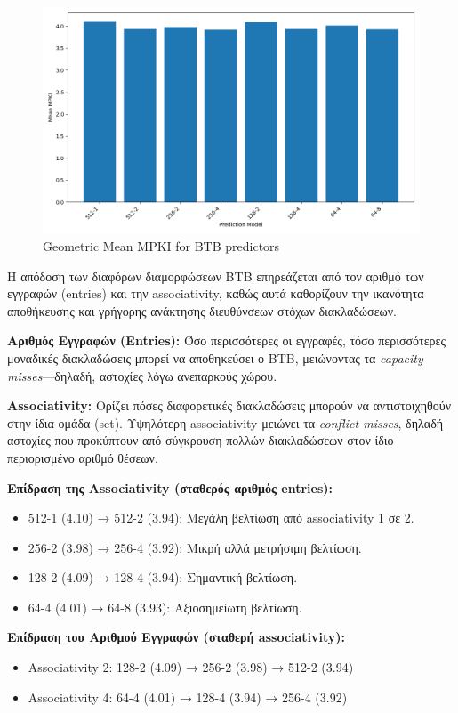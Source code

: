 \documentclass{article}
\begin{document}
\begin{figure}[H]
    \centering
    \includegraphics[width=1\textwidth]{figures/5_4/geom_mean.png}
    \caption{Geometric Mean MPKI for BTB predictors}
    \label{fig:mean_mpkis_BTBs}
\end{figure}

Η απόδοση των διαφόρων διαμορφώσεων BTB επηρεάζεται από τον αριθμό των εγγραφών (entries) και την associativity, καθώς αυτά καθορίζουν την ικανότητα αποθήκευσης και γρήγορης ανάκτησης διευθύνσεων στόχων διακλαδώσεων.

\textbf{Αριθμός Εγγραφών (Entries):} Όσο περισσότερες οι εγγραφές, τόσο περισσότερες μοναδικές διακλαδώσεις μπορεί να αποθηκεύσει ο BTB, μειώνοντας τα \textit{capacity misses}—δηλαδή, αστοχίες λόγω ανεπαρκούς χώρου.

\textbf{Associativity:} Ορίζει πόσες διαφορετικές διακλαδώσεις μπορούν να αντιστοιχηθούν στην ίδια ομάδα (set). Υψηλότερη associativity μειώνει τα \textit{conflict misses}, δηλαδή αστοχίες που προκύπτουν από σύγκρουση πολλών διακλαδώσεων στον ίδιο περιορισμένο αριθμό θέσεων.

\vspace{0.3cm} \textbf{Επίδραση της Associativity (σταθερός αριθμός entries):} \begin{itemize} \item 512-1 (4.10) → 512-2 (3.94): Μεγάλη βελτίωση από associativity 1 σε 2. \item 256-2 (3.98) → 256-4 (3.92): Μικρή αλλά μετρήσιμη βελτίωση. \item 128-2 (4.09) → 128-4 (3.94): Σημαντική βελτίωση. \item 64-4 (4.01) → 64-8 (3.93): Αξιοσημείωτη βελτίωση. \end{itemize}

\textbf{Επίδραση του Αριθμού Εγγραφών (σταθερή associativity):} \begin{itemize} \item Associativity 2: 128-2 (4.09) → 256-2 (3.98) → 512-2 (3.94) \item Associativity 4: 64-4 (4.01) → 128-4 (3.94) → 256-4 (3.92) \end{itemize}
\end{document}
